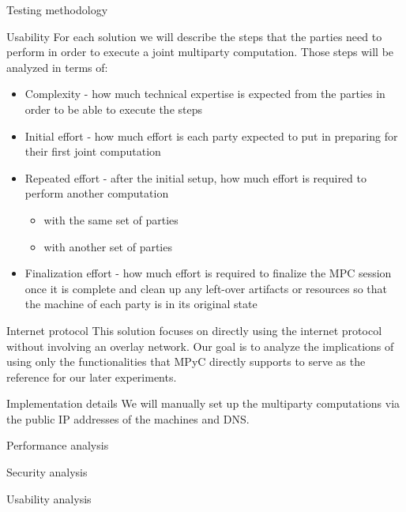 \begin{frame}{Testing methodology}
\begin{block}{Usability}
\protect\hypertarget{usability}{}
For each solution we will describe the steps that the parties need to
perform in order to execute a joint multiparty computation. Those steps
will be analyzed in terms of:

\begin{itemize}
\tightlist
\item
  Complexity - how much technical expertise is expected from the parties
  in order to be able to execute the steps
\item
  Initial effort - how much effort is each party expected to put in
  preparing for their first joint computation
\item
  Repeated effort - after the initial setup, how much effort is required
  to perform another computation

  \begin{itemize}
  \tightlist
  \item
    with the same set of parties
  \item
    with another set of parties
  \end{itemize}
\item
  Finalization effort - how much effort is required to finalize the MPC
  session once it is complete and clean up any left-over artifacts or
  resources so that the machine of each party is in its original state
\end{itemize}
\end{block}
\end{frame}

\begin{frame}{Internet protocol}
\protect\hypertarget{internet-protocol}{}
This solution focuses on directly using the internet protocol without
involving an overlay network. Our goal is to analyze the implications of
using only the functionalities that MPyC directly supports to serve as
the reference for our later experiments.

\begin{block}{Implementation details}
\protect\hypertarget{implementation-details}{}
We will manually set up the multiparty computations via the public IP
addresses of the machines and DNS.
\end{block}

\begin{block}{Performance analysis}
\protect\hypertarget{performance-analysis}{}
\end{block}

\begin{block}{Security analysis}
\protect\hypertarget{security-analysis}{}
\end{block}

\begin{block}{Usability analysis}
\protect\hypertarget{usability-analysis}{}
\end{block}
\end{frame}

